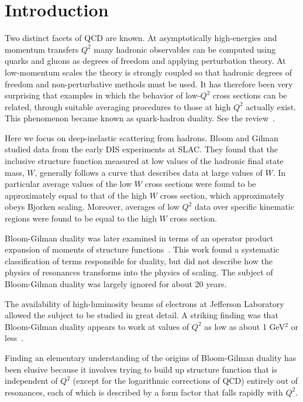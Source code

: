 \documentclass[aps,prd,amsmath,longbibliography]{revtex4-1}
\begin{document}
\maketitle
\section{Introduction}

Two  distinct facets of QCD are known. At asymptotically high-energies and momentum transfers $Q^2$ many hadronic observables can be computed using quarks and gluons as degrees of freedom and applying perturbation theory.   At low-momentum scales the theory is strongly coupled so that  hadronic degrees of freedom and  non-perturbative methods must be used. It has therefore been very  surprising that  examples in which the behavior of low-$Q^2$  cross sections can be  related, through suitable averaging procedures to those at high $Q^2$ actually exist. This phenomenon became known as quark-hadron duality. 
See the review~\cite{Melnitchouk:2005zr}.

Here we focus on deep-inelastic scattering from hadrons. Bloom and Gilman~\cite{Bloom:1970xb,Bloom:1971ye} studied data from the early DIS experiments at SLAC. They found that the inclusive structure function measured at low values of the hadronic final state mass, $W$, generally follows a curve that describes data at large values of $W$. In particular average values of the low $W$ cross sections were found to be  approximately equal to that of the high $W$ cross section, which approximately obeys Bjorken scaling. Moreover, averages of low $Q^2$ data over specific kinematic regions were found to be equal to the high $W$ cross section.

Bloom-Gilman duality was later examined in terms of an operator product expansion of moments of structure functions~\cite{DeRujula:1976ke,DeRujula:1976baf}. This work found a systematic  classification of terms responsible for duality, but did not describe how the physics of resonances transforms into the physics of scaling.  The subject of Bloom-Gilman duality was largely ignored for about 20 years.

The availability of high-luminosity beams of electrons at Jefferson Laboratory allowed the subject to be studied in great detail. A striking finding was that Bloom-Gilman duality appears to work at  values of $Q^2$ as low as about 1 GeV$^2$ or less~\cite{Niculescu:2000tk,Niculescu:2000tj,Ent:2000jj}.

Finding an elementary understanding of the origins of Bloom-Gilman duality has been elusive because it involves trying to build up structure function that is independent of $Q^2$ (except for the logarithmic corrections of QCD)  entirely out of resonances, each of which is described by a form factor that falls rapidly with $Q^2$.
\end{document}
